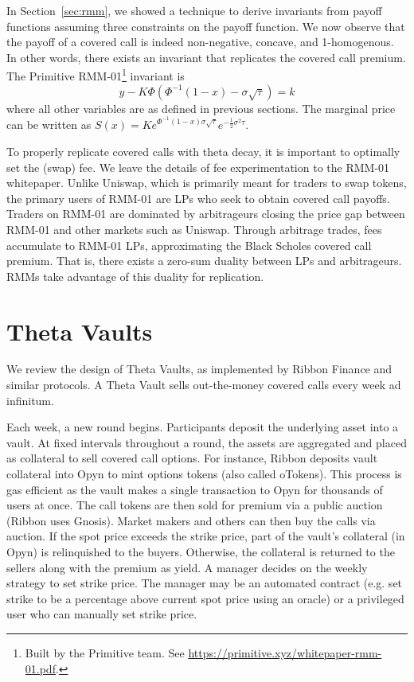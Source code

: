 \documentclass[hidelinks, 12pt]{article}
\begin{document}
In Section~\ref{sec:rmm}, we showed a technique to derive invariants from payoff functions assuming three constraints on the payoff function. We now observe that the payoff of a covered call is indeed non-negative, concave, and 1-homogenous. In other words, there exists an invariant that replicates the covered call premium. The Primitive RMM-01\footnote{Built by the Primitive team. See \url{https://primitive.xyz/whitepaper-rmm-01.pdf}.} invariant is
\begin{equation}
    y - K\Phi(\Phi^{-1}(1-x)-\sigma\sqrt{\tau}) = k
\label{eq:invariant}
\end{equation}
where all other variables are as defined in previous sections. The marginal price can be written as $S(x) = Ke^{\Phi^{-1}(1-x)\sigma\sqrt{\tau}}e^{-\frac{1}{2}\sigma^2\tau}$.

To properly replicate covered calls with theta decay, it is important to optimally set the (swap) fee. We leave the details of fee experimentation to the RMM-01 whitepaper. Unlike Uniswap, which is primarily meant for traders to swap tokens, the primary users of RMM-01 are LPs who seek to obtain covered call payoffs. Traders on RMM-01 are dominated by arbitrageurs closing the price gap between RMM-01 and other markets such as Uniswap. Through arbitrage trades, fees accumulate to RMM-01 LPs, approximating the Black Scholes covered call premium. That is, there exists a zero-sum duality between LPs and arbitrageurs. RMMs take advantage of this duality for replication.

\section{Theta Vaults}
\label{sec:theta}

We review the design of Theta Vaults, as implemented by Ribbon Finance and similar protocols. A Theta Vault sells out-the-money covered calls every week ad infinitum.

Each week, a new round begins. Participants deposit the underlying asset into a vault. At fixed intervals throughout a round, the assets are aggregated and placed as collateral to sell covered call options. For instance, Ribbon deposits vault collateral into Opyn to mint options tokens (also called oTokens). This process is gas efficient as the vault makes a single transaction to Opyn for thousands of users at once. The call tokens are then sold for premium via a public auction (Ribbon uses Gnosis). Market makers and others can then buy the calls via auction. If the spot price exceeds the strike price, part of the vault's collateral (in Opyn) is relinquished to the buyers. Otherwise, the collateral is returned to the sellers along with the premium as yield.
A manager decides on the weekly strategy to set strike price. The manager may be an automated contract (e.g. set strike to be a percentage above current spot price using an oracle) or a privileged user who can manually set strike price.
\end{document}

